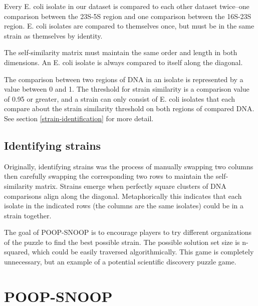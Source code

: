 Every E. coli isolate in our dataset is compared to each other dataset twice--one comparison between the 23S-5S region and one comparison between the 16S-23S region. E. coli isolates are compared to themselves once, but must be in the same strain as themselves by identity. 

The self-similarity matrix must maintain the same order and length in both dimensions. An E. coli isolate is always compared to itself along the diagonal.

The comparison between two regions of DNA in an isolate is represented by a value between 0 and 1. The threshold for strain similarity is a comparison value of 0.95 or greater, and a strain can only consist of E. coli isolates that each compare about the strain similarity threshold on both regions of compared DNA. See section \ref{strain-identification} for more detail.

\subsection{Identifying strains}

Originally, identifying strains was the process of manually swapping two columns then carefully swapping the corresponding two rows to maintain the self-similarity matrix. Strains emerge when perfectly square clusters of DNA comparisons align along the diagonal. Metaphorically this indicates that each isolate in the indicated rows (the columns are the same isolates) could be in a strain together.

The goal of POOP-SNOOP is to encourage players to try different organizations of the puzzle to find the best possible strain. The possible solution set size is n-squared, which could be easily traversed algorithmically. This game is completely unnecessary, but an example of a potential scientific discovery puzzle game.

\section{POOP-SNOOP}


